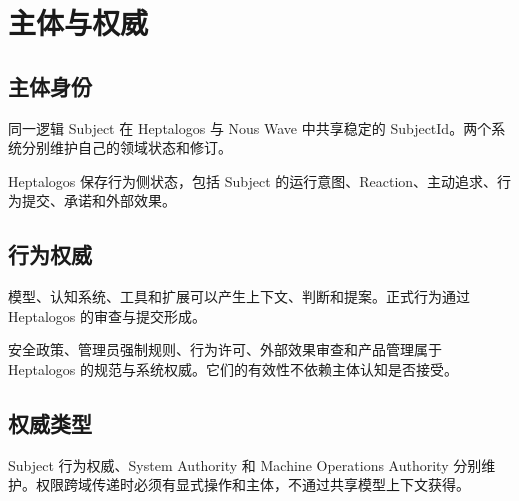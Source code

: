 \chapter{主体与权威}

\section{主体身份}

同一逻辑 Subject 在 Heptalogos 与 Nous Wave 中共享稳定的 SubjectId。两个系统分别维护自己的领域状态和修订。

Heptalogos 保存行为侧状态，包括 Subject 的运行意图、Reaction、主动追求、行为提交、承诺和外部效果。

\section{行为权威}

模型、认知系统、工具和扩展可以产生上下文、判断和提案。正式行为通过 Heptalogos 的审查与提交形成。

安全政策、管理员强制规则、行为许可、外部效果审查和产品管理属于 Heptalogos 的规范与系统权威。它们的有效性不依赖主体认知是否接受。

\section{权威类型}

Subject 行为权威、System Authority 和 Machine Operations Authority 分别维护。权限跨域传递时必须有显式操作和主体，不通过共享模型上下文获得。
